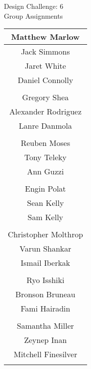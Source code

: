 \documentclass{article}
\begin{document}
\renewcommand{\arraystretch}{1.2} 
\begin{center}
{\Large Design Challenge: 6\\ 
Group Assignments} \\ 
\begin{tabular}{|c|} \hline 
 Matthew Marlow\\ \hline 
 Jack Simmons\\ \hline 
 Jaret White\\ \hline 
 Daniel Connolly\\ \hline 
\multicolumn{1}{c}{\vspace{1mm}} \\ 
\hline 
 Gregory Shea\\ \hline 
 Alexander Rodriguez\\ \hline 
 Lanre Danmola\\ \hline 
\multicolumn{1}{c}{\vspace{1mm}} \\ 
\hline 
 Reuben Moses\\ \hline 
 Tony Teleky\\ \hline 
 Ann Guzzi\\ \hline 
\multicolumn{1}{c}{\vspace{1mm}} \\ 
\hline 
 Engin Polat\\ \hline 
 Sean Kelly\\ \hline 
 Sam Kelly\\ \hline 
\multicolumn{1}{c}{\vspace{1mm}} \\ 
\hline 
 Christopher Molthrop\\ \hline 
 Varun Shankar\\ \hline 
 Ismail Iberkak\\ \hline 
\multicolumn{1}{c}{\vspace{1mm}} \\ 
\hline 
 Ryo Isshiki\\ \hline 
 Bronson Bruneau\\ \hline 
 Fami Hairadin\\ \hline 
\multicolumn{1}{c}{\vspace{1mm}} \\ 
\hline 
 Samantha Miller\\ \hline 
 Zeynep Inan\\ \hline 
 Mitchell Finesilver\\ \hline 
\multicolumn{1}{c}{\vspace{1mm}} \\ 
\hline 

\end{tabular}
\end{center}
\end{document}
